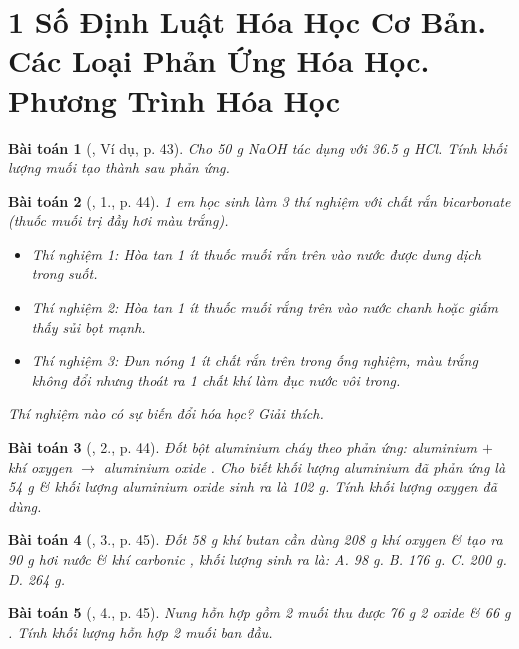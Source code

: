 \documentclass{article}
\newtheorem{baitoan}{Bài toán}
\begin{document}
\section{1 Số Định Luật Hóa Học Cơ Bản. Các Loại Phản Ứng Hóa Học. Phương Trình Hóa Học}

\begin{baitoan}[\cite{An_Hoa_Hoc_nang_cao_8_9}, Ví dụ, p. 43]
	Cho {\rm50 g NaOH} tác dụng với {\rm36.5 g HCl}. Tính khối lượng muối tạo thành sau phản ứng.
\end{baitoan}

\begin{baitoan}[\cite{An_Hoa_Hoc_nang_cao_8_9}, 1., p. 44]
	1 em học sinh làm 3 thí nghiệm với chất rắn bicarbonate (thuốc muối trị đầy hơi màu trắng).
	\begin{itemize}
		\item Thí nghiệm 1: Hòa tan 1 ít thuốc muối rắn trên vào nước được dung dịch trong suốt.
		\item Thí nghiệm 2: Hòa tan 1 ít thuốc muối rắng trên vào nước chanh hoặc giấm thấy sủi bọt mạnh.
		\item Thí nghiệm 3: Đun nóng 1 ít chất rắn trên trong ống nghiệm, màu trắng không đổi nhưng thoát ra 1 chất khí làm đục nước vôi trong.
	\end{itemize}
	Thí nghiệm nào có sự biến đổi hóa học? Giải thích.
\end{baitoan}

\begin{baitoan}[\cite{An_Hoa_Hoc_nang_cao_8_9}, 2., p. 44]
	Đốt bột aluminium cháy theo phản ứng: aluminium $+$ khí oxygen $\to$ aluminium oxide {\rm{}}. Cho biết khối lượng aluminium đã phản ứng là {\rm54 g} \& khối lượng aluminium oxide sinh ra là {\rm102 g}. Tính khối lượng oxygen đã dùng.
\end{baitoan}

\begin{baitoan}[\cite{An_Hoa_Hoc_nang_cao_8_9}, 3., p. 45]
	Đốt {\rm58 g} khí butan {\rm{}} cần dùng {\rm208 g} khí oxygen \& tạo ra {\rm90 g} hơi nước \& khí carbonic {\rm{}}, khối lượng {\rm{}} sinh ra là: {\sf A.} {\rm98 g}. {\sf B.} {\rm176 g}. {\sf C.} {\rm200 g}. {\sf D.} {\rm264 g}.
\end{baitoan}

\begin{baitoan}[\cite{An_Hoa_Hoc_nang_cao_8_9}, 4., p. 45]
	Nung hỗn hợp gồm 2 muối {\rm{}} thu được {\rm76 g} 2 oxide \& {\rm66 g }. Tính khối lượng hỗn hợp 2 muối ban đầu.
\end{baitoan}
\end{document}
